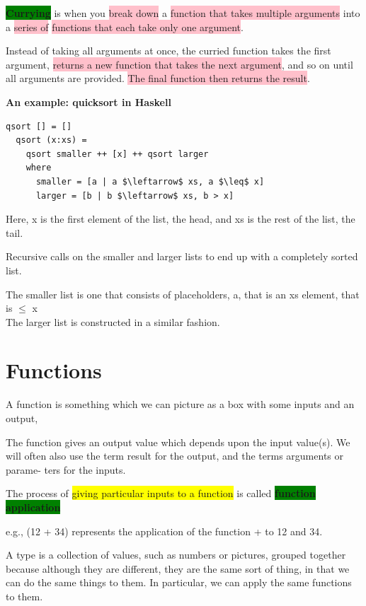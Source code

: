 \documentclass[tikz,border=10pt]{project_plan}
\begin{document}
\colorbox{green}{\textbf{Currying}} is when you \colorbox{pink}{break down} a \colorbox{pink}{function that takes multiple arguments} into a \colorbox{pink}{series of} \colorbox{pink}{functions that each take only one argument}.

Instead of taking all arguments at once, the curried function takes the first argument, \colorbox{pink}{returns a new function that takes the next argument}, and so on until all arguments are provided. \colorbox{pink}{The final function then returns the result}.

\textbf{An example: quicksort in Haskell}

\begin{lstlisting}[mathescape=true]
  qsort [] = []
  qsort (x:xs) =
    qsort smaller ++ [x] ++ qsort larger
    where
      smaller = [a | a $\leftarrow$ xs, a $\leq$ x]
      larger = [b | b $\leftarrow$ xs, b > x]
\end{lstlisting}

Here, x is the first element of the list, the head, and xs is the rest of the list, the tail.

Recursive calls on the smaller and larger lists to end up with a completely sorted list.

The smaller list is one that consists of placeholders, a, that is an xs element, that is $\leq$ x\\
The larger list is constructed in a similar fashion.

\section{Functions}

A function is something which we can picture as a box with some inputs and an output,

The function gives an output value which depends upon the input value(s). We will
often also use the term result for the output, and the terms arguments or parame-
ters for the inputs.

The process of \colorbox{yellow}{giving particular inputs to a function} is called \colorbox{green}{\textbf{function application}}

e.g.,  (12 + 34) represents the application of the function + to 12 and 34.

A type is a collection of values, such as numbers or pictures, grouped together
because although they are different, they are the same sort of thing, in that we
can do the same things to them. In particular, we can apply the same functions to them.
\end{document}
